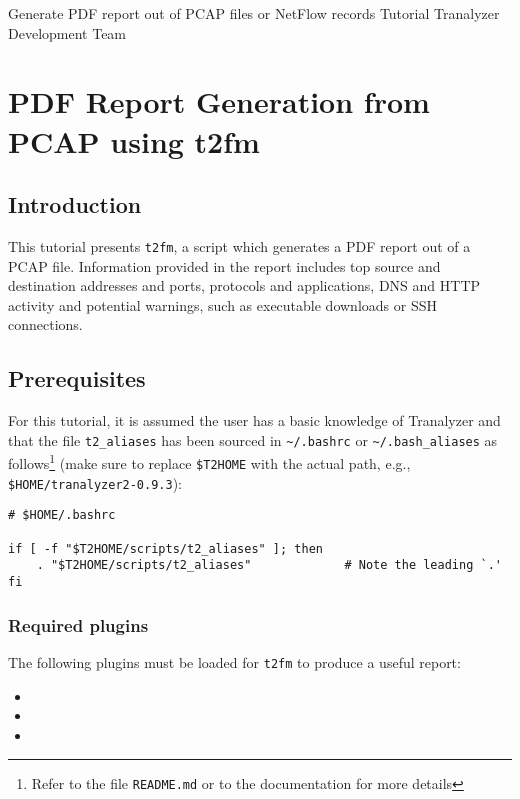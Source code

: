 \documentclass[documentation]{subfiles}
\begin{document}
\trantitle
    {Generate PDF report out of PCAP files or NetFlow records}
    {Tutorial} %
    {Tranalyzer Development Team} %

\section{PDF Report Generation from PCAP using t2fm}\label{t2fm_tutorial}

\subsection{Introduction}
This tutorial presents {\tt t2fm}, a script which generates a PDF report out of a PCAP file. Information provided in the report includes top source and destination addresses and ports, protocols and applications, DNS and HTTP activity and potential warnings, such as executable downloads or SSH connections. %

\subsection{Prerequisites}\label{s:t2fm-prereq}
For this tutorial, it is assumed the user has a basic knowledge of Tranalyzer and that the file {\tt t2\_aliases} has been sourced in {\tt\textasciitilde{}/.bashrc} or {\tt\textasciitilde{}/.bash\_aliases} as follows\footnote{Refer to the file {\tt README.md} or to the documentation for more details} (make sure to replace {\tt\$T2HOME} with the actual path, e.g., {\tt\$HOME/tranalyzer2-0.9.3}):\\
\begin{verbatim}
# $HOME/.bashrc

if [ -f "$T2HOME/scripts/t2_aliases" ]; then
    . "$T2HOME/scripts/t2_aliases"             # Note the leading `.'
fi
\end{verbatim}

    \subsubsection{Required plugins}
        The following plugins must be loaded for {\tt t2fm} to produce a useful report:
        \begin{multicols}{3}
            \begin{itemize}
                \item {}
                \item {}
                \item {}
            \end{itemize}
        \end{multicols}
\end{document}
